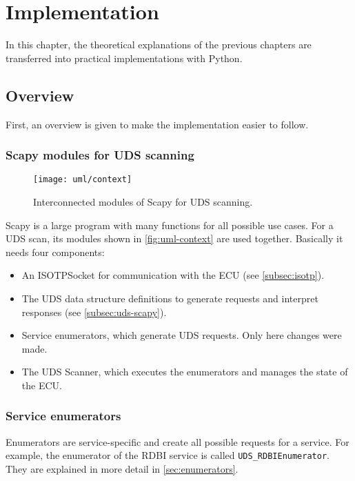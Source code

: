 \chapter{Implementation}

In this chapter, the theoretical explanations of the previous chapters are transferred into practical implementations with Python.

\section{Overview}

First, an overview is given to make the implementation easier to follow.

\subsection{Scapy modules for UDS scanning}

\begin{figure}[htb]
    \centering
    \texttt{[image: uml/context]}
    \caption{Interconnected modules of Scapy for UDS scanning.}
    \label{fig:uml-context}
\end{figure}

Scapy is a large program with many functions for all possible use cases. For a UDS scan, its modules shown in \autoref{fig:uml-context} are used together. Basically it needs four components:

\begin{itemize}
    \item An ISOTPSocket for communication with the ECU (see \autoref{subsec:isotp}).
    \item The UDS data structure definitions to generate requests and interpret responses (see \autoref{subsec:uds-scapy}).
    \item Service enumerators, which generate UDS requests. Only here changes were made.
    \item The UDS Scanner, which executes the enumerators and manages the state of the ECU.
\end{itemize}


\subsection{Service enumerators}

Enumerators are service-specific and create all possible requests for a service. For example, the enumerator of the RDBI service is called \texttt{UDS_RDBIEnumerator}. They are explained in more detail in \autoref{sec:enumerators}.

